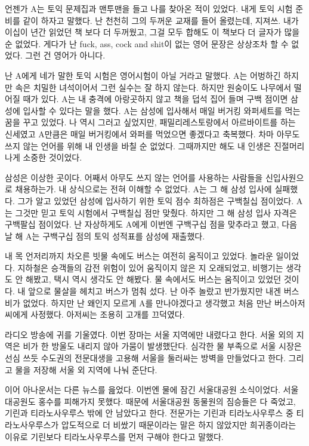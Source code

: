\documentclass[a5paper,10pt, twoside, openright]{memoir}
\begin{document}
	언젠가 A는 토익 문제집과 맨투맨을 들고 나를 찾아온 적이 있었다. 내게 토익 시험 준비를 같이 하자고 말했다. 난 천천히 그의 두꺼운 교재를 들어 올렸는데, 지져쓰. 내가 이십이 년간 읽었던 책 보다 더 두꺼웠고, 그걸 모두 합해도 이 책보다 더 글자가 많을 순 없었다. 게다가 난 fuck, ass, cock and shit이 없는 영어 문장은 상상조차 할 수 없었다. 그런 건 영어가 아니다. 
	
	난 A에게 네가 말한 토익 시험은 영어시험이 아닐 거라고 말했다. A는 어벙하긴 하지만 속은 치밀한 녀석이어서 그런 실수는 잘 하지 않는다. 하지만 원숭이도 나무에서 떨어질 때가 있다. A는 내 충격에 아랑곳하지 않고 책을 덥석 집어 들며 구백 점이면 삼성에 입사할 수 있다는 말을 했다. A는 삼성에 입사해서 매일 버거킹 와퍼세트를 먹는 꿈을 꾸고 있었다. 나 역시 그러고 싶었지만, 패밀리레스토랑에서 아르바이트를 하는 신세였고 A만큼은 매일 버거킹에서 와퍼를 먹었으면 좋겠다고 축복했다. 차마 아무도 쓰지 않는 언어를 위해 내 인생을 바칠 순 없었다. 그때까지만 해도 내 인생은 진절머리 나게 소중한 것이었다. 
	
	삼성은 이상한 곳이다. 어째서 아무도 쓰지 않는 언어를 사용하는 사람들을 신입사원으로 채용하는가. 내 상식으로는 전혀 이해할 수 없었다. A는 그 해 삼성 입사에 실패했다. 그가 알고 있었던 삼성에 입사하기 위한 토익 점수 최하점은 구백칠십 점이었다. A는 그것만 믿고 토익 시험에서 구백칠십 점만 맞췄다. 하지만 그 해 삼성 입사 자격은 구백팔십 점이었다. 난 자상하게도 A에게 이번엔 구백구십 점을 맞추라고 했고, 다음 날 해 A는 구백구십 점의 토익 성적표를 삼성에 재출했다. 

	내 목 언저리까지 차오른 빗물 속에도 버스는 여전히 움직이고 있었다. 놀라운 일이었다. 지하철은 승객들의 감전 위험이 있어 움직이지 않은 지 오래되었고, 비행기는 생각도 안 해봤고, 택시 역시 생각도 안 해봤다. 물 속에서도 버스는 움직이고 있었던 것이다. 내 앞으로 물살을 헤치고 버스가 멈춰 섰다. 난 아주 놀랐고 반가웠지만 내겐 버스비가 없었다. 하지만 난 왜인지 모르게 A를 만나야겠다고 생각했고 처음 만난 버스아저씨에게 사정했다. 아저씨는 조용히 고개를 끄덕였다. 

	라디오 방송에 귀를 기울였다. 이번 장마는 서울 지역에만 내렸다고 한다. 서울 외의 지역은 비가 한 방울도 내리지 않아 가뭄이 발생했단다. 심각한 물 부족으로 서울 시장은 선심 쓰듯 수도권의 전문대생을 고용해 서울을 둘러싸는 방벽을 만들었다고 한다. 그리고 물을 저장해 서울 외 지역에 나눠 준단다. 
	
	이어 아나운서는 다른 뉴스를 읊었다. 이번엔 물에 잠긴 서울대공원 소식이었다. 서울대공원도 홍수를 피해가지 못했다. 때문에 서울대공원 동물원의 짐승들은 다 죽었고, 기린과 티라노사우루스 밖에 안 남았다고 한다. 전문가는 기린과 티라노사우루스 중 티라노사우루스가 압도적으로 더 비쌌기 때문이라는 말은 하지 않았지만 희귀종이라는 이유로 기린보다 티라노사우루스를 먼저 구해야 한다고 말했다. 
	
\end{document}
